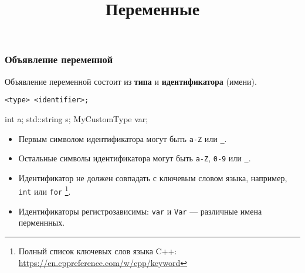 \documentclass[compress, 8pt]{beamer}
\title{Переменные}
\begin{document}
\frame[plain]{\titlepage}

\begin{frame}[fragile]

    \frametitle{Объявление переменной}

    Объявление переменной состоит из \textbf{типа} и \textbf{идентификатора} (имени).

    \begin{center}

        \verb|<type> <identifier>;|

        \begin{myinplacelisting}[minted language=cpp]
int a;
std::string s;
MyCustomType var;
        \end{myinplacelisting}

    \end{center}

    \begin{itemize}

        \item Первым символом идентификатора могут быть \verb|a-Z| или \verb|_|.

        \item Остальные символы идентификатора могут быть \verb|a-Z|,
            \verb|0-9| или \verb|_|.

        \item Идентификатор не должен совпадать с ключевым словом языка,
            например, \verb|int| или \verb|for|
            \footnote{Полный список ключевых слов языка C++:
                \url{https://en.cppreference.com/w/cpp/keyword}}.

        \item Идентификаторы регистрозависимы: \verb|var| и \verb|Var| ---
            различные имена перменнных.

    \end{itemize}

\end{frame}
\end{document}
